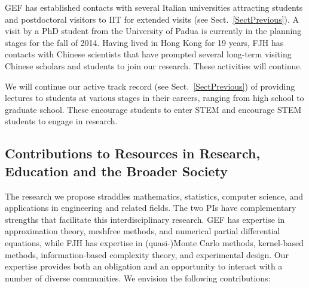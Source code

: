 \documentclass[11pt]{NSFamsart}
\begin{document}
\begin{description}[leftmargin=2.5ex]
\item[Supervising Visitors]
GEF has established contacts with several Italian universities attracting students and postdoctoral visitors to IIT for extended visits (see Sect.~\ref{SectPrevious}). A visit by a PhD student from the University of Padua is currently in the planning stages for the fall of 2014.  Having lived in Hong Kong for 19 years, FJH has contacts with Chinese scientists that have prompted several long-term visiting Chinese scholars and students to join our research.  These activities will continue.

\item[Giving Short Courses and Invited Lectures]
We will continue our active track record (see Sect.~\ref{SectPrevious}) of providing lectures to students at various stages in their careers, ranging from high school to graduate school. These encourage students to enter STEM and encourage STEM students to engage in research.

\end{description}

\subsection{Contributions to Resources in Research, Education and the Broader Society}

The research we propose straddles mathematics, statistics, computer science, and applications in engineering and related fields.  The two PIs have complementary strengths that facilitate this interdisciplinary research.  GEF has expertise in approximation theory, meshfree methods, and numerical partial differential equations, while FJH has expertise in (quasi-)Monte Carlo methods, kernel-based methods, information-based complexity theory, and experimental design. Our expertise provides both an obligation and an opportunity to interact with a number of diverse communities. We envision the following contributions:
\end{document}

